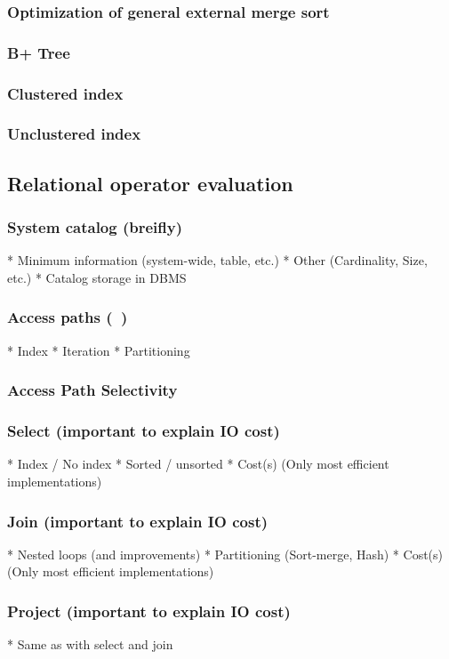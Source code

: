 \documentclass[a4paper,10pt,titlepage]{report}
\begin{document}
\subsubsection{Optimization of general external merge sort}
\subsubsection{B+ Tree}
\subsubsection{Clustered index}
\subsubsection{Unclustered index}


\newpage
\subsection{Relational operator evaluation}


\subsubsection{System catalog (breifly)}
     * Minimum information (system-wide, table, etc.)
     * Other (Cardinality, Size, etc.)
     * Catalog storage in DBMS
\subsubsection{Access paths (~)}
     * Index
     * Iteration
     * Partitioning
\subsubsection{Access Path Selectivity}
 \subsubsection{Select (important to explain IO cost)}
     * Index / No index
     * Sorted / unsorted
     * Cost(s) (Only most efficient implementations)
\subsubsection{Join (important to explain IO cost)}
     * Nested loops (and improvements)
     * Partitioning (Sort-merge, Hash)
     * Cost(s) (Only most efficient implementations)
\subsubsection{Project (important to explain IO cost)}
     * Same as with select and join
\end{document}
